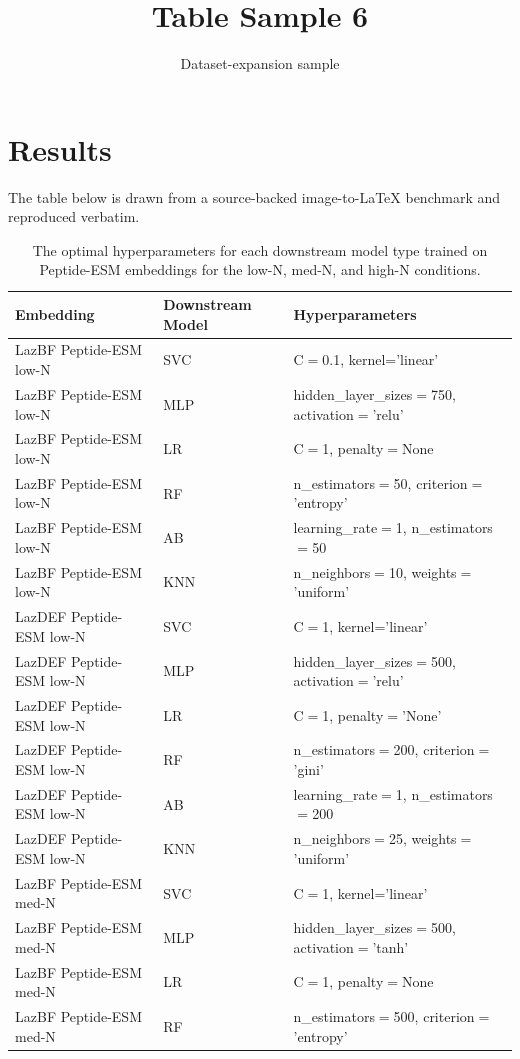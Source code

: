 \documentclass[11pt]{article}
\title{Table Sample 6}
\author{Dataset-expansion sample}
\date{}
\begin{document}
\maketitle
\section{Results}
The table below is drawn from a source-backed image-to-LaTeX benchmark and reproduced verbatim.

\begin{table}
\caption{The optimal hyperparameters for each downstream model type trained on Peptide-ESM embeddings for the low-N, med-N, and high-N conditions.}
\begin{tabular}
{|l|l|l|}
\hline
Embedding & Downstream Model & Hyperparameters \\
\hline
LazBF Peptide-ESM low-N & SVC & C$=$0.1, kernel='linear' \\
LazBF Peptide-ESM low-N & MLP & hidden\_layer\_sizes$=$750, activation$=$'relu' \\
LazBF Peptide-ESM low-N & LR & C$=$1, penalty$=$None \\
LazBF Peptide-ESM low-N & RF & n\_estimators$=$50, criterion$=$'entropy' \\
LazBF Peptide-ESM low-N & AB & learning\_rate$=$1, n\_estimators$=$50 \\
LazBF Peptide-ESM low-N & KNN & n\_neighbors$=$10, weights$=$'uniform' \\
LazDEF Peptide-ESM low-N & SVC & C$=$1, kernel='linear' \\
LazDEF Peptide-ESM low-N & MLP & hidden\_layer\_sizes$=$500, activation$=$'relu' \\
LazDEF Peptide-ESM low-N & LR & C$=$1, penalty$=$'None' \\
LazDEF Peptide-ESM low-N & RF & n\_estimators$=$200, criterion$=$'gini' \\
LazDEF Peptide-ESM low-N & AB & learning\_rate$=$1, n\_estimators$=$200 \\
LazDEF Peptide-ESM low-N & KNN & n\_neighbors$=$25, weights$=$'uniform' \\
LazBF Peptide-ESM med-N & SVC & C$=$1, kernel='linear' \\
LazBF Peptide-ESM med-N & MLP & hidden\_layer\_sizes$=$500, activation$=$'tanh' \\
LazBF Peptide-ESM med-N & LR & C$=$1, penalty$=$None \\
LazBF Peptide-ESM med-N & RF & n\_estimators$=$500, criterion$=$'entropy' \\

\end{tabular}
\end{table}
\end{document}
